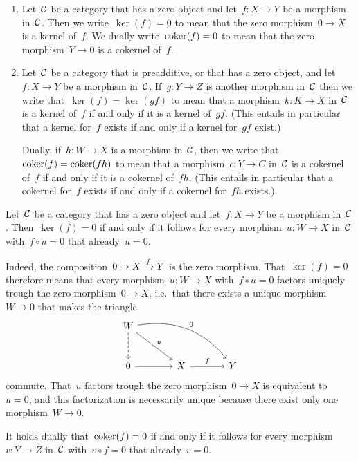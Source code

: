 









\begin{notation*}
  \leavevmode
  \begin{enumerate}
    \item
      Let~$\mathcal{C}$ be a category that has a zero object and let~$f \colon X \to Y$ be a morphism in~$\mathcal{C}$.
      Then we write~$\ker(f) = 0$ to mean that the zero morphism~$0 \to X$ is a kernel of~$f$.
      We dually write~$\operatorname{coker}(f) = 0$ to mean that the zero morphism~$Y \to 0$ is a cokernel of~$f$.
    \item
      Let~$\mathcal{C}$ be a category that is preadditive, or that has a zero object, and let~$f \colon X \to Y$ be a morphism in~$\mathcal{C}$.
      If~$g \colon Y \to Z$ is another morphism in~$\mathcal{C}$ then we write that~$\ker(f) = \ker(gf)$ to mean that a morphism~$k \colon K \to X$ in~$\mathcal{C}$ is a kernel of~$f$ if and only if it is a kernel of~$gf$.
      (This entails in particular that a kernel for~$f$ exists if and only if a kernel for~$gf$ exist.)
      
      Dually, if~$h \colon W \to X$ is a morphism in~$\mathcal{C}$, then we write that~$\operatorname{coker}(f) = \operatorname{coker}(fh)$ to mean that a morphism~$c \colon Y \to C$ in~$\mathcal{C}$ is a cokernel of~$f$ if and only if it is a cokernel of~$fh$.
      (This entails in particular that a cokernel for~$f$ exists if and only if a cokernel for~$fh$ exists.)
  \end{enumerate}
\end{notation*}


\begin{remark*}
  Let~$\mathcal{C}$ be a category that has a zero object and let~$f \colon X \to Y$ be a morphism in~$\mathcal{C}$.
  Then~$\ker(f) = 0$ if and only if it follows for every morphism~$u \colon W \to X$ in~$\mathcal{C}$ with~$f \circ u = 0$ that already~$u = 0$.
  
  Indeed, the composition~$0 \to X \xrightarrow{f} Y$ is the zero morphism.
  That~$\ker(f) = 0$ therefore means that every morphism~$u \colon W \to X$ with~$f \circ u = 0$ factors uniquely trough the zero morphism~$0 \to X$, i.e.\ that there exists a unique morphism~$W \to 0$ that makes the triangle
  \[
    \begin{tikzcd}[sep = large]
        W
        \arrow[dashed]{d}
        \arrow{dr}[above right]{u}
        \arrow[bend left]{drr}[above right]{0}
      & {}
      & {}
      \\
        0
        \arrow{r}
      & X
        \arrow{r}[above]{f}
      & Y
    \end{tikzcd}
  \]
  commute.
  That~$u$ factors trough the zero morphism~$0 \to X$ is equivalent to~$u = 0$, and this factorization is necessarily unique because there exist only one morphism~$W \to 0$.
  
  It holds dually that~$\operatorname{coker}(f) = 0$ if and only if it follows for every morphism~$v \colon Y \to Z$ in~$\mathcal{C}$ with~$v \circ f = 0$ that already~$v = 0$.
\end{remark*}


